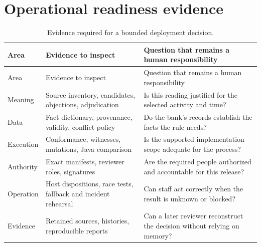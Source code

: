 \section{Operational readiness evidence}
\begin{longtable}{@{}P{31mm}P{60mm}P{57mm}@{}}
\caption{Evidence required for a bounded deployment decision.}\\
\toprule
Area & Evidence to inspect & Question that remains a human responsibility\\\midrule\endfirsthead
\toprule Area & Evidence to inspect & Question that remains a human responsibility\\\midrule\endhead
Meaning & Source inventory, candidates, objections, adjudication & Is this reading justified for the selected activity and time?\\
Data & Fact dictionary, provenance, validity, conflict policy & Do the bank's records establish the facts the rule needs?\\
Execution & Conformance, witnesses, mutations, Java comparison & Is the supported implementation scope adequate for the process?\\
Authority & Exact manifests, reviewer roles, signatures & Are the required people authorized and accountable for this release?\\
Operation & Host dispositions, race tests, fallback and incident rehearsal & Can staff act correctly when the result is unknown or blocked?\\
Evidence & Retained sources, histories, reproducible reports & Can a later reviewer reconstruct the decision without relying on memory?\\
\bottomrule
\end{longtable}
